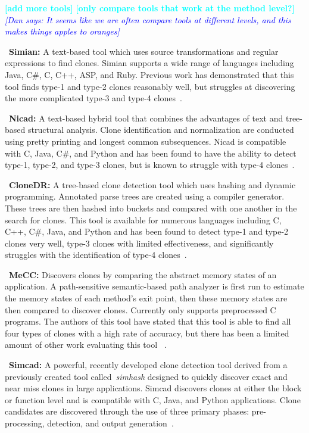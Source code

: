\documentclass[smallextended]{svjour3}       %
\newcommand{\todo}[1]{\textcolor{cyan}{\textbf{[#1]}}}
\newcommand{\dan}[1]{\textcolor{blue}{{\it [Dan says: #1]}}}
\begin{document}
\todo{add more tools}
\todo{only compare tools that work at the method level?}\dan{It seems like we are often compare tools at different levels, and this makes things apples to oranges}




\begin{description}
\item~\textbf{Simian:} A text-based tool which uses source transformations and regular expressions to find clones. Simian supports a wide range of languages including Java, C\#, C, C++, ASP, and Ruby. Previous work has demonstrated that this tool finds type-1 and type-2 clones reasonably well, but struggles at discovering the more complicated type-3 and type-4 clones~\cite{simian_URL,Roy:2009:CEC:1530898.1531101}.
\item~\textbf{Nicad:} A text-based hybrid tool that combines the advantages of text and tree-based structural analysis. Clone identification and normalization are conducted using pretty printing and longest common subsequences. Nicad is compatible with C, Java, C\#, and Python and has been found to have the ability to detect type-1, type-2, and type-3 clones, but is known to struggle with type-4 clones~\cite{Roy:2008:NAD:1437898.1438600,Roy:2008:ESF:1447565.1448036,Roy:2009:CEC:1530898.1531101}.
\item~\textbf{CloneDR:} A tree-based clone detection tool which uses hashing and dynamic programming. Annotated parse trees are created using a compiler generator. These trees are then hashed into buckets and compared with one another in the search for clones. This tool is available for numerous languages including C, C++, C\#, Java, and Python and has been found to detect type-1 and type-2 clones very well, type-3 clones with limited effectiveness, and significantly struggles with the identification of type-4 clones~\cite{cloneDR_URL,Baxter:1998:CDU:850947.853341,Rattan20131165,Roy:2009:CEC:1530898.1531101}.
\item~\textbf{MeCC:} Discovers clones by comparing the abstract memory states of an application. A path-sensitive semantic-based path analyzer is first run to estimate the memory states of each method's exit point, then these memory states are then compared to discover clones. Currently only supports preprocessed C programs. The authors of this tool have stated that this tool is able to find all four types of clones with a high rate of accuracy, but there has been a limited amount of other work evaluating this tool ~\cite{Kim:2011:MMC:1985793.1985835,meccURL,kawrykow2011enabling}.
\item~\textbf{Simcad:} A powerful, recently developed clone detection tool derived from a previously created tool called~\emph{simhash} designed to quickly discover exact and near miss clones in large applications. Simcad discovers clones at either the block or function level and is compatible with C, Java, and Python applications. Clone candidates are discovered through the use of three primary phases: pre-processing, detection, and output generation~\cite{6613857}.


\end{description}
\end{document}
